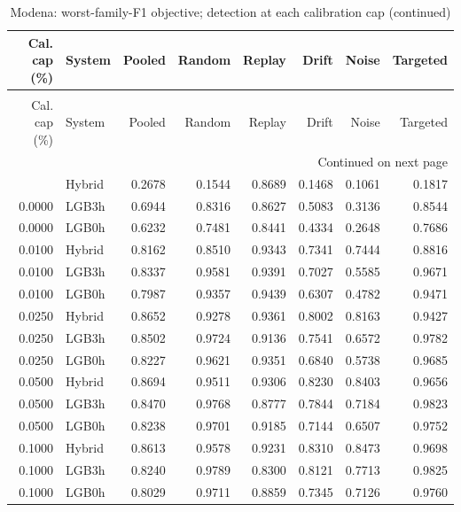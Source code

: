 \begingroup
\small
\setlength{\tabcolsep}{4pt}
\renewcommand{\arraystretch}{1.1}
\begin{longtable}{@{}rlrrrrrr@{}}
\caption{Modena: worst-family-F1 objective; detection at each calibration cap}\label{tab:selected_modena_balanced_detection-supp20261008}\\
\toprule
\shortstack{Cal. cap\\(\%)} & System & Pooled & Random & Replay & Drift & Noise & Targeted \\
\midrule
\endfirsthead
\caption[]{Modena: worst-family-F1 objective; detection at each calibration cap (continued)}\\
\toprule
\shortstack{Cal. cap\\(\%)} & System & Pooled & Random & Replay & Drift & Noise & Targeted \\
\midrule
\endhead
\midrule
\multicolumn{8}{r}{Continued on next page}\\
\endfoot
\bottomrule
\endlastfoot
0.0000 & Hybrid & 0.2678 & 0.1544 & 0.8689 & 0.1468 & 0.1061 & 0.1817 \\*
0.0000 & LGB3h & 0.6944 & 0.8316 & 0.8627 & 0.5083 & 0.3136 & 0.8544 \\*
0.0000 & LGB0h & 0.6232 & 0.7481 & 0.8441 & 0.4334 & 0.2648 & 0.7686 \\
0.0100 & Hybrid & 0.8162 & 0.8510 & 0.9343 & 0.7341 & 0.7444 & 0.8816 \\*
0.0100 & LGB3h & 0.8337 & 0.9581 & 0.9391 & 0.7027 & 0.5585 & 0.9671 \\*
0.0100 & LGB0h & 0.7987 & 0.9357 & 0.9439 & 0.6307 & 0.4782 & 0.9471 \\
0.0250 & Hybrid & 0.8652 & 0.9278 & 0.9361 & 0.8002 & 0.8163 & 0.9427 \\*
0.0250 & LGB3h & 0.8502 & 0.9724 & 0.9136 & 0.7541 & 0.6572 & 0.9782 \\*
0.0250 & LGB0h & 0.8227 & 0.9621 & 0.9351 & 0.6840 & 0.5738 & 0.9685 \\
0.0500 & Hybrid & 0.8694 & 0.9511 & 0.9306 & 0.8230 & 0.8403 & 0.9656 \\*
0.0500 & LGB3h & 0.8470 & 0.9768 & 0.8777 & 0.7844 & 0.7184 & 0.9823 \\*
0.0500 & LGB0h & 0.8238 & 0.9701 & 0.9185 & 0.7144 & 0.6507 & 0.9752 \\
0.1000 & Hybrid & 0.8613 & 0.9578 & 0.9231 & 0.8310 & 0.8473 & 0.9698 \\*
0.1000 & LGB3h & 0.8240 & 0.9789 & 0.8300 & 0.8121 & 0.7713 & 0.9825 \\*
0.1000 & LGB0h & 0.8029 & 0.9711 & 0.8859 & 0.7345 & 0.7126 & 0.9760 \\

\end{longtable}
